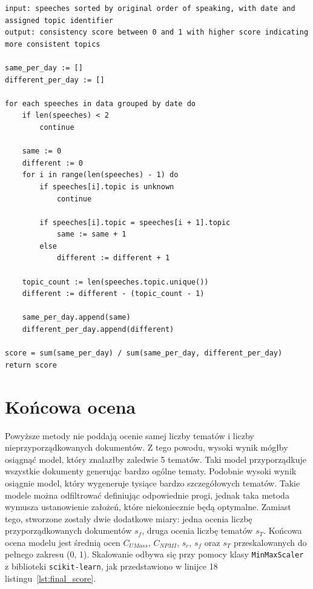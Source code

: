 	\begin{lstlisting}[style=algorithm,label=lst:consistency_alg,caption=Algorytm obliczania spójności tematów]
input: speeches sorted by original order of speaking, with date and assigned topic identifier
output: consistency score between 0 and 1 with higher score indicating more consistent topics
	
same_per_day := []
different_per_day := []

for each speeches in data grouped by date do
	if len(speeches) < 2
		continue
	
	same := 0
	different := 0
	for i in range(len(speeches) - 1) do
		if speeches[i].topic is unknown
			continue

		if speeches[i].topic = speeches[i + 1].topic
			same := same + 1
		else
			different := different + 1

	topic_count := len(speeches.topic.unique())
	different := different - (topic_count - 1)
	
	same_per_day.append(same)
	different_per_day.append(different)

score = sum(same_per_day) / sum(same_per_day, different_per_day)
return score
	\end{lstlisting}

\section{Końcowa ocena}
	Powyższe metody nie poddają ocenie samej liczby tematów i liczby nieprzyporządkowanych dokumentów.
	Z tego powodu, wysoki wynik mógłby osiągnąć model, który znalazłby zaledwie 5 tematów.
	Taki model przyporządkuje wszystkie dokumenty generując bardzo ogólne tematy.
	Podobnie wysoki wynik osiągnie model, który wygeneruje tysiące bardzo szczegółowych tematów.
	Takie modele można odfiltrować definiując odpowiednie progi, jednak taka metoda wymusza ustanowienie założeń,
		które niekoniecznie będą optymalne.
	Zamiast tego, stworzone zostały dwie dodatkowe miary: jedna ocenia liczbę przyporządkowanych dokumentów \(s_f\), druga ocenia liczbę tematów \(s_T\).
	Końcowa ocena modelu jest średnią ocen \(C_{UMass}\), \(C_{NPMI}\), \(s_c\), \(s_f\) oraz \(s_T\) przeskalowanych do pełnego zakresu (0, 1).
	Skalowanie odbywa się przy pomocy klasy \verb|MinMaxScaler| z biblioteki \verb|scikit-learn|,
		jak przedstawiono w linijce 18 listingu~\ref{lst:final_score}.

